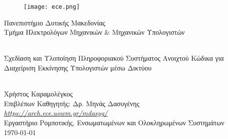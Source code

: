 
\begin{titlepage}
	\begin{center}
		\begin{figure}[h]
			\centering \texttt{[image: ece.png]}
		\end{figure}
		{\LARGE Πανεπιστήμιο Δυτικής Μακεδονίας\\}
		{\Large Τμήμα Ηλεκτρολόγων Μηχανικών \& Μηχανικών Υπολογιστών}

		\begin{center}
			\vspace{2cm}
			\HRule \\[0.4cm]
			{\huge Σχεδίαση και Υλοποίηση Πληροφοριακού Συστήματος Ανοιχτού Κώδικα για Διαχείριση Εκκίνησης Υπολογιστών μέσω Δικτύου\\}
			\HRule \\[0.4cm]
		\end{center}

		\vfill
		\begin{doublespacing}
			{\LARGE Χρήστος Καραμολέγκος\\}
			{\Large Επιβλέπων Καθηγητής: Δρ. Μηνάς Δασυγένης\\}
			{\Large \href{https://arch.ece.uowm.gr/mdasyg/}{\textit{https://arch.ece.uowm.gr/mdasyg/}}\\}
			{\Large Εργαστήριο Ρομποτικής, Ενσωματωμένων και Ολοκληρωμένων Συστημάτων\\}
			\vfill 
			{\Large \today}
		\end{doublespacing}
	\end{center}
	\newpage
	\thispagestyle{empty}
	\mbox{}
\end{titlepage}

